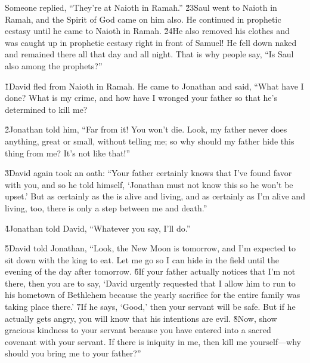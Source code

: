 Someone replied, ``They're at Naioth in Ramah.'' \v{23}Saul went to Naioth in Ramah, and the Spirit of God came on him also. He continued in prophetic ecstasy until he came to Naioth in Ramah. \v{24}He also removed his clothes and was caught up in prophetic ecstasy right in front of Samuel! He fell down naked and remained there all that day and all night. That is why people say, ``Is Saul also among the prophets?''

\v{1}David fled from Naioth in Ramah. He came to Jonathan and said, ``What have I done? What is my crime, and how have I wronged your father so that he's determined to kill me?

\v{2}Jonathan told him, ``Far from it! You won't die. Look, my father never does anything, great or small, without telling me; so why should my father hide this thing from me? It's not like that!''

\v{3}David again took an oath: ``Your father certainly knows that I've found favor with you, and so he told himself, `Jonathan must not know this so he won't be upset.' But as certainly as the  is alive and living, and as certainly as I'm alive and living, too, there is only a step between me and death.''

\v{4}Jonathan told David, ``Whatever you say, I'll do.''

\v{5}David told Jonathan, ``Look, the New Moon is tomorrow, and I'm expected to sit down with the king to eat. Let me go so I can hide in the field until the evening of the day after tomorrow. \v{6}If your father actually notices that I'm not there, then you are to say, `David urgently requested that I allow him to run to his hometown of Bethlehem because the yearly sacrifice for the entire family was taking place there.' \v{7}If he says, `Good,' then your servant will be safe. But if he actually gets angry, you will know that his intentions are evil. \v{8}Now, show gracious kindness to your servant because you have entered into a sacred covenant with your servant. If there is iniquity in me, then kill me yourself---why should you bring me to your father?''

